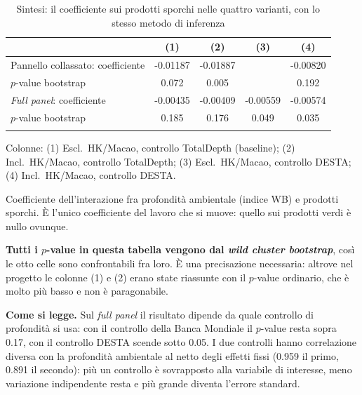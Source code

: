 \begin{table}[htbp]
\centering
\footnotesize
\caption{Sintesi: il coefficiente sui prodotti sporchi nelle quattro varianti, con lo stesso metodo di inferenza}
\label{tab:matrice}
\begin{threeparttable}
\begin{tabular}{lcccc}
\toprule
 & (1) & (2) & (3) & (4) \\
\midrule
Pannello collassato: coefficiente & -0.01187 & -0.01887 &  & -0.00820 \\
\quad $p$-value bootstrap & 0.072 & 0.005 &  & 0.192 \\
\addlinespace
\emph{Full panel}: coefficiente & -0.00435 & -0.00409 & -0.00559 & -0.00574 \\
\quad $p$-value bootstrap & 0.185 & 0.176 & 0.049 & 0.035 \\
\addlinespace
\bottomrule
\end{tabular}
\begin{tablenotes}[flushleft]\footnotesize
\item Colonne: (1) Escl.\ HK/Macao, controllo TotalDepth (baseline); (2) Incl.\ HK/Macao, controllo TotalDepth; (3) Escl.\ HK/Macao, controllo DESTA; (4) Incl.\ HK/Macao, controllo DESTA.
\item Coefficiente dell'interazione fra profondit\`a ambientale (indice WB) e prodotti sporchi. \`E l'unico coefficiente del lavoro che si muove: quello sui prodotti verdi \`e nullo ovunque.
\item \textbf{Tutti i $p$-value in questa tabella vengono dal \emph{wild cluster bootstrap}}, cos\`i le otto celle sono confrontabili fra loro. \`E una precisazione necessaria: altrove nel progetto le colonne (1) e (2) erano state riassunte con il $p$-value ordinario, che \`e molto pi\`u basso e non \`e paragonabile.
\item \textbf{Come si legge.} Sul \emph{full panel} il risultato dipende da quale controllo di profondit\`a si usa: con il controllo della Banca Mondiale il $p$-value resta sopra 0.17, con il controllo DESTA scende sotto 0.05. I due controlli hanno correlazione diversa con la profondit\`a ambientale al netto degli effetti fissi (0.959 il primo, 0.891 il secondo): pi\`u un controllo \`e sovrapposto alla variabile di interesse, meno variazione indipendente resta e pi\`u grande diventa l'errore standard.
\end{tablenotes}
\end{threeparttable}
\end{table}
